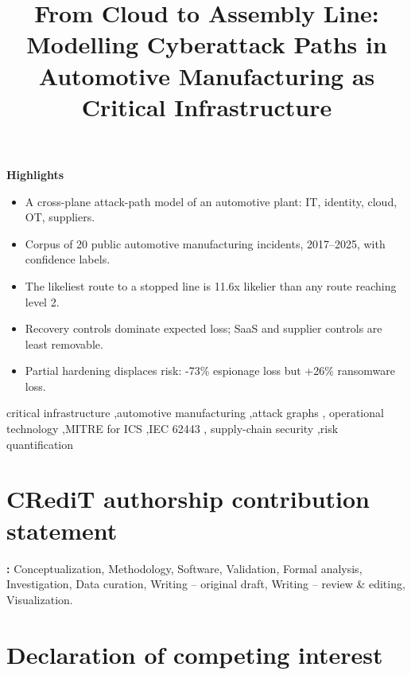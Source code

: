 \documentclass[preprint,12pt]{elsarticle}
\newenvironment{highlights}{\par\noindent\textbf{Highlights}\begin{itemize}}%
                             {\end{itemize}\par}}{}
\begin{document}
\begin{frontmatter}

\title{From Cloud to Assembly Line: Modelling Cyberattack Paths in Automotive
Manufacturing as Critical Infrastructure}

\author[aff1]{\capmauthor{}}
\ead{\capmemail}

\begin{abstract}
\capmabstract
\end{abstract}

\begin{highlights}
\item A cross-plane attack-path model of an automotive plant: IT, identity, cloud, OT, suppliers.
\item Corpus of 20 public automotive manufacturing incidents, 2017--2025, with confidence labels.
\item The likeliest route to a stopped line is 11.6x likelier than any route reaching level 2.
\item Recovery controls dominate expected loss; SaaS and supplier controls are least removable.
\item Partial hardening displaces risk: -73\% espionage loss but +26\% ransomware loss.
\end{highlights}

\begin{keyword}
critical infrastructure \sep automotive manufacturing \sep attack graphs \sep
operational technology \sep MITRE \attck{} for ICS \sep IEC 62443 \sep
supply-chain security \sep risk quantification
\end{keyword}

\end{frontmatter}



\section*{CRediT authorship contribution statement}

\textbf{\capmauthor:} Conceptualization, Methodology, Software, Validation,
Formal analysis, Investigation, Data curation, Writing -- original draft,
Writing -- review \& editing, Visualization.

\section*{Declaration of competing interest}
\end{document}
